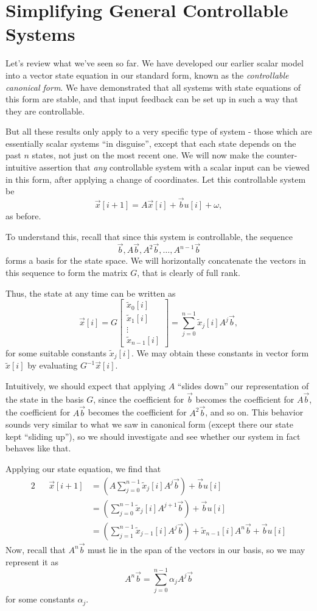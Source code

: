 \documentclass[letterpaper]{article}
\theoremstyle{remark}
\renewcommand{\tilde}[1]{\widetilde{#1}}
\newcommand{\mat}[1]{\ensuremath{\begin{bmatrix}#1\end{bmatrix}}}
\newcommand{\eqn}[1]{\begin{alignat*}{2}#1\end{alignat*}}
\begin{document}
\section{Simplifying General Controllable Systems}
Let's review what we've seen so far. We have developed our earlier scalar model into a vector state equation in our standard form, known as the \emph{controllable canonical form}. We have demonstrated that all systems with state equations of this form are stable, and that input feedback can be set up in such a way that they are controllable.

But all these results only apply to a very specific type of system - those which are essentially scalar systems ``in disguise'', except that each state depends on the past $n$ states, not just on the most recent one. We will now make the counter-intuitive assertion that \emph{any} controllable system with a scalar input can be viewed in this form, after applying a change of coordinates. Let this controllable system be
\[
    \vec{x}[i + 1] = A\vec{x}[i] + \vec{b}u[i] + \omega,
\]
as before.

To understand this, recall that since this system is controllable, the sequence
\[
    \vec{b}, A\vec{b}, A^2\vec{b}, \ldots, A^{n-1}\vec{b}
\]
forms a basis for the state space. We will horizontally concatenate the vectors in this sequence to form the matrix $G$, that is clearly of full rank.

Thus, the state at any time can be written as
\[
    \vec{x}[i] = G\mat{\tilde{x}_0[i] \\ \tilde{x}_1[i] \\ \vdots \\ \tilde{x}_{n-1}[i]} = \sum_{j = 0}^{n - 1} \tilde{x}_j[i] A^j \vec{b},
\]
for some suitable constants $\tilde{x}_j[i]$. We may obtain these constants in vector form $\tilde{x}[i]$ by evaluating $G^{-1}\vec{x}[i]$.

Intuitively, we should expect that applying $A$ ``slides down'' our representation of the state in the basis $G$, since the coefficient for $\vec{b}$ becomes the coefficient for $A\vec{b}$, the coefficient for $A\vec{b}$ becomes the coefficient for $A^2\vec{b}$, and so on. This behavior sounds very similar to what we saw in canonical form (except there our state kept ``sliding up''), so we should investigate and see whether our system in fact behaves like that.

Applying our state equation, we find that
\eqn{
    && \vec{x}[i + 1] &= \left(A\sum_{j = 0}^{n - 1} \tilde{x}_j[i] A^j \vec{b}\right) + \vec{b}u[i] \\
    &&&= \left(\sum_{j = 0}^{n - 1} \tilde{x}_j[i] A^{j + 1} \vec{b}\right) + \vec{b}u[i] \\
    &&&= \left(\sum_{j = 1}^{n - 1} \tilde{x}_{j-1}[i] A^{j} \vec{b}\right) + \tilde{x}_{n-1}[i]A^n\vec{b} + \vec{b}u[i]
}
Now, recall that $A^n\vec{b}$ must lie in the span of the vectors in our basis, so we may represent it as
\[
    A^n\vec{b} = \sum_{j=0}^{n-1} \alpha_jA^j\vec{b}
\]
for some constants $\alpha_j$.
\end{document}
